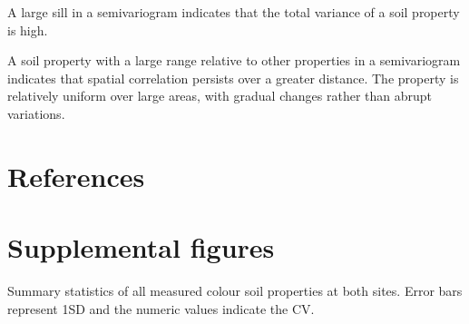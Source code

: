 \documentclass[
  number]{elsarticle}
\begin{document}
A large sill in a semivariogram indicates that the total variance of a
soil property is high.

A soil property with a large range relative to other properties in a
semivariogram indicates that spatial correlation persists over a greater
distance. The property is relatively uniform over large areas, with
gradual changes rather than abrupt variations.

\section*{References}\label{references}

\renewcommand{\bibsection}{}


\section*{Supplemental figures}\label{supplemental-figures}

\begin{suppfig}


\caption{\label{suppfig-colour_summary}Summary statistics of all
measured colour soil properties at both sites. Error bars represent 1SD
and the numeric values indicate the CV.}

\end{suppfig}%
\end{document}
